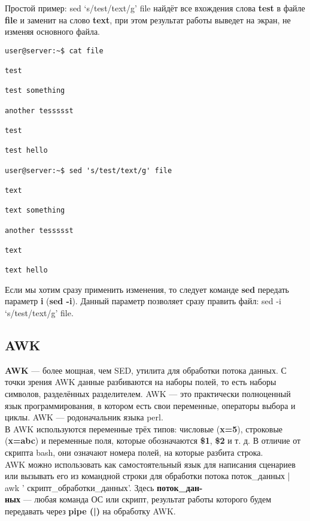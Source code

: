 \documentclass[14pt, a4paper]{article}
\begin{document}
Простой пример: \colorbox{backcolour}{sed ‘s/test/text/g’ file} найдёт все вхождения слова \textbf{test} в файле \textbf{file} и
заменит на слово \textbf{text}, при этом результат работы выведет на экран, не изменяя основного файла.

\vspace{0.3cm}

\begin{lstlisting}
user@server:~$ cat file

test

test something

another tessssst

test

test hello

user@server:~$ sed 's/test/text/g' file

text

text something

another tessssst

text

text hello

\end{lstlisting}
\vspace{0.2cm}

Если мы хотим сразу применить изменения, то следует команде \textbf{sed} передать параметр \textbf{i} (\textbf{sed -i}).
Данный параметр позволяет сразу править файл: \colorbox{backcolour}{sed -i ‘s/test/text/g’ file}.

\subsection*{AWK} 

\textbf{AWK} — более мощная, чем SED, утилита для обработки потока данных. С точки зрения AWK данные
разбиваются на наборы полей, то есть наборы символов, разделённых разделителем. AWK — это
практически полноценный язык программирования, в котором есть свои переменные, операторы
выбора и циклы. AWK — родоначальник языка perl.\\

В AWK используются переменные трёх типов: числовые (\textbf{x=5}), строковые (\textbf{x=abc}) и переменные поля,
которые обозначаются \textbf{\$1}, \textbf{\$2} и т. д. В отличие от скрипта bash, они означают номера полей, на
которые разбита строка.\\

AWK можно использовать как самостоятельный язык для написания сценариев или вызывать его из
командной строки для обработки потока 
\colorbox{backcolour}{поток\_данных | awk '{ скрипт\_обработки\_данных}'}. Здесь \textbf{поток\_дан-} \\
\textbf{ных} — любая команда ОС или скрипт, результат работы которого будем передавать через \textbf{pipe (|)} на обработку AWK.\\
\end{document}
